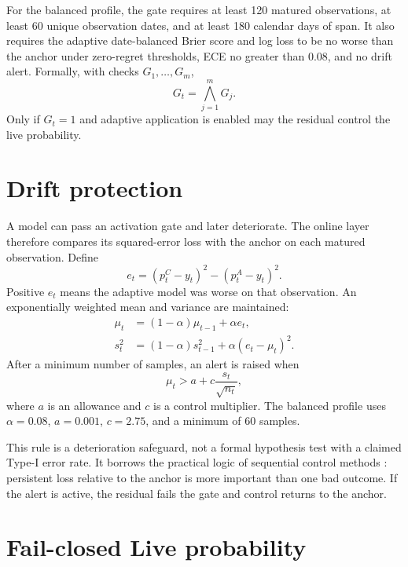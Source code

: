 \documentclass[11pt]{article}
\begin{document}
For the balanced profile, the gate requires at least 120 matured observations, at least 60 unique observation dates, and at least 180 calendar days of span. It also requires the adaptive date-balanced Brier score and log loss to be no worse than the anchor under zero-regret thresholds, ECE no greater than 0.08, and no drift alert. Formally, with checks $G_1,\ldots,G_m$,
\begin{equation}
G_t=\bigwedge_{j=1}^{m}G_j.
\label{eq:gate}
\end{equation}
Only if $G_t=1$ and adaptive application is enabled may the residual control the live probability.

\section{Drift protection}
\label{sec:drift}

A model can pass an activation gate and later deteriorate. The online layer therefore compares its squared-error loss with the anchor on each matured observation. Define
\begin{equation}
e_t=(p_t^C-y_t)^2-(p_t^A-y_t)^2.
\label{eq:lossdiff}
\end{equation}
Positive $e_t$ means the adaptive model was worse on that observation. An exponentially weighted mean and variance are maintained:
\begin{align}
\mu_t&=(1-\alpha)\mu_{t-1}+\alpha e_t,\\
s_t^2&=(1-\alpha)s_{t-1}^2+\alpha(e_t-\mu_t)^2.
\label{eq:ewma}
\end{align}
After a minimum number of samples, an alert is raised when
\begin{equation}
\mu_t>a+c\frac{s_t}{\sqrt{n_t}},
\label{eq:driftalert}
\end{equation}
where $a$ is an allowance and $c$ is a control multiplier. The balanced profile uses $\alpha=0.08$, $a=0.001$, $c=2.75$, and a minimum of 60 samples.

This rule is a deterioration safeguard, not a formal hypothesis test with a claimed Type-I error rate. It borrows the practical logic of sequential control methods \citep{page1954continuous,roberts1959control}: persistent loss relative to the anchor is more important than one bad outcome. If the alert is active, the residual fails the gate and control returns to the anchor.

\section{Fail-closed Live probability}
\label{sec:live}
\end{document}
